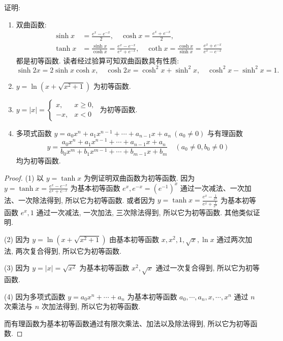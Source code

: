 \begin{example}\label{ex:2.1.1}
证明:
\begin{enumerate}[label=(\arabic*)]
  \item 双曲函数:
  \begin{align*}
  \sinh x &= \frac{e^{x}-e^{-x}}{2},\quad \cosh x=\frac{e^{x}+e^{-x}}{2}, \\
  \tanh x &= \frac{\sinh x}{\cosh x}=\frac{e^{x}-e^{-x}}{e^{x}+e^{-x}},\quad \coth x=\frac{\cosh x}{\sinh x}=\frac{e^{x}+e^{-x}}{e^{x}-e^{-x}}
\end{align*}
  都是初等函数. 读者经过验算可知双曲函数具有性质:
  \[
  \sinh 2x=2\sinh x\cosh x,\quad \cosh 2x=\cosh^{2}x+\sinh^{2}x,\quad \cosh^{2}x-\sinh^{2}x=1.
\]
  \item $y=\ln(x+\sqrt{x^{2}+1})$ 为初等函数.
  \item $y=|x|=\begin{cases} x, & x\geqslant0, \\ -x, & x<0 \end{cases}$ 为初等函数.
  \item 多项式函数 $y = a_{0}x^{n} + a_{1}x^{n-1} + \cdots + a_{n-1}x + a_{n}\ (a_{0} \neq 0)$ 与有理函数
  \[
  y = \frac{a_{0}x^{n} + a_{1}x^{n-1} + \cdots + a_{n-1}x + a_{n}}{b_{0}x^{m} + b_{1}x^{m-1} + \cdots + b_{m-1}x + b_{m}}\quad (a_{0} \neq 0, b_{0} \neq 0)
\]
  均为初等函数.
\end{enumerate}
\end{example}

\begin{proof}
(1) 以 $y = \tanh x$ 为例证明双曲函数为初等函数. 因为 $y = \tanh x = \frac{e^{x} - e^{-x}}{e^{x} + e^{-x}}$ 为基本初等函数 $e^{x}, e^{-x} = (e^{-1})^{x}$ 通过一次减法、一次加法、一次除法得到, 所以它为初等函数. 或者因为 $y = \tanh x = \frac{e^{x} - \frac{1}{e^{x}}}{e^{x} + \frac{1}{e^{x}}}$ 为基本初等函数 $e^{x}, 1$ 通过一次减法, 一次加法, 三次除法得到, 所以它为初等函数. 其他类似证明.

(2) 因为 $y=\ln(x+\sqrt{x^{2}+1})$ 由基本初等函数 $x, x^{2}, 1, \sqrt{x}, \ln x$ 通过两次加法, 两次复合得到, 所以它为初等函数.

(3) 因为 $y=|x|=\sqrt{x^{2}}$ 为基本初等函数 $x^{2}, \sqrt{x}$ 通过一次复合得到, 所以它为初等函数.

(4) 因为多项式函数 $y=a_{0}x^{n}+\cdots+a_{n}$ 为基本初等函数 $a_{0}, \cdots, a_{n}, x, \cdots, x^{n}$ 通过 $n$ 次乘法与 $n$ 次加法得到, 所以它为初等函数.

而有理函数为基本初等函数通过有限次乘法、加法以及除法得到, 所以它为初等函数.
\end{proof}

